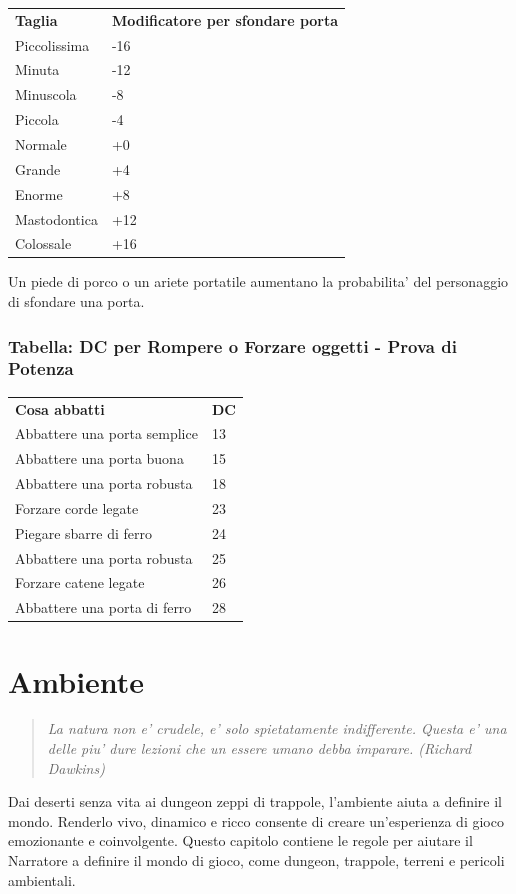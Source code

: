 \documentclass[a4paper,11pt,twoside,openany]{book}
\begin{document}
{\begin{tabular}{ll}
\toprule
\textbf{Taglia} & \textbf{Modificatore per sfondare porta}\tabularnewline
Piccolissima & -16\tabularnewline
Minuta & -12\tabularnewline
Minuscola & -8\tabularnewline
Piccola & -4\tabularnewline
Normale & +0\tabularnewline
Grande & +4\tabularnewline
Enorme & +8\tabularnewline
Mastodontica & +12\tabularnewline
Colossale & +16\tabularnewline
\end{tabular}

\bigskip

Un piede di porco o un ariete portatile aumentano la probabilita' del personaggio di sfondare una porta.

\subsubsection{Tabella: DC per Rompere o Forzare oggetti - Prova di Potenza}

\label{tabella-dc-per-rompere-o-forzare-oggetti---prova-di-potenza}
\bigskip

\begin{tabular}{ll}
\toprule
\textbf{Cosa abbatti} & \textbf{DC}\tabularnewline
Abbattere una porta semplice & 13\tabularnewline
Abbattere una porta buona & 15\tabularnewline
Abbattere una porta robusta & 18\tabularnewline
Forzare corde legate & 23\tabularnewline
Piegare sbarre di ferro & 24\tabularnewline
Abbattere una porta robusta & 25\tabularnewline
Forzare catene legate & 26\tabularnewline
Abbattere una porta di ferro & 28\tabularnewline
\end{tabular}
\bigskip

\pagebreak

\section{Ambiente}

\label{ambiente}
\begin{quote}\textit{
La natura non e' crudele, e' solo spietatamente indifferente. Questa e' una delle piu' dure lezioni che un essere umano debba imparare. (Richard Dawkins)
}\end{quote}

Dai deserti senza vita ai dungeon zeppi di trappole, l'ambiente aiuta a definire il mondo. Renderlo vivo, dinamico e ricco consente di creare un'esperienza di gioco emozionante e coinvolgente. Questo capitolo contiene le regole per aiutare il Narratore a definire il mondo di gioco, come dungeon, trappole, terreni e pericoli ambientali.

}
\end{document}
